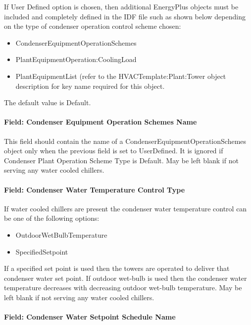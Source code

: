 If User Defined option is chosen, then additional EnergyPlus objects must be included and completely defined in the IDF file such as shown below depending on the type of condenser operation control scheme chosen:

\begin{itemize}
\item
  CondenserEquipmentOperationSchemes
\item
  PlantEquipmentOperation:CoolingLoad
\item
  PlantEquipmentList (refer to the HVACTemplate:Plant:Tower object description for key name required for this object.
\end{itemize}

The default value is Default.

\paragraph{Field: Condenser Equipment Operation Schemes Name}\label{field-condenser-equipment-operation-schemes-name}

This field should contain the name of a CondenserEquipmentOperationSchemes object only when the previous field is set to UserDefined. It is ignored if Condenser Plant Operation Scheme Type is Default. May be left blank if not serving any water cooled chillers.

\paragraph{Field: Condenser Water Temperature Control Type}\label{field-condenser-water-temperature-control-type}

If water cooled chillers are present the condenser water temperature control can be one of the following options:

\begin{itemize}
\item
  OutdoorWetBulbTemperature
\item
  SpecifiedSetpoint
\end{itemize}

If a specified set point is used then the towers are operated to deliver that condenser water set point. If outdoor wet-bulb is used then the condenser water temperature decreases with decreasing outdoor wet-bulb temperature. May be left blank if not serving any water cooled chillers.

\paragraph{Field: Condenser Water Setpoint Schedule Name}\label{field-condenser-water-setpoint-schedule-name}

